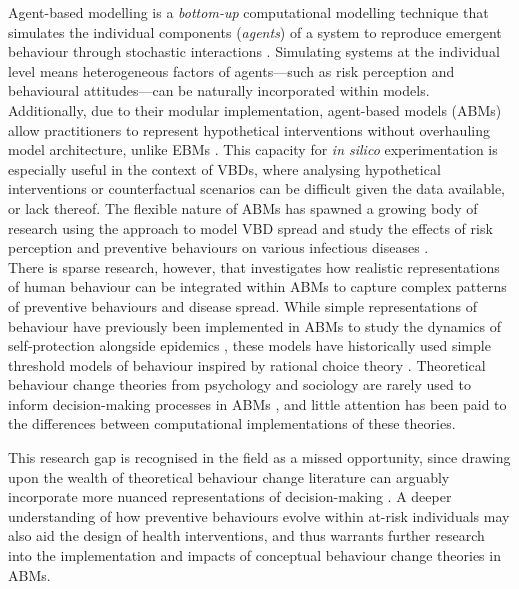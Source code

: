 Agent-based modelling is a \textit{bottom-up} computational modelling technique that simulates the individual components (\textit{agents}) of a system to reproduce emergent behaviour through stochastic interactions \cite{epstein_growing_1996}. Simulating systems at the individual level means heterogeneous factors of agents---such as risk perception and behavioural attitudes---can be naturally incorporated within models. Additionally, due to their modular implementation, agent-based models (ABMs) allow practitioners to represent hypothetical interventions without overhauling model architecture, unlike EBMs \cite{axtell_agent-based_2022}. This capacity for \textit{in silico} experimentation is especially useful in the context of VBDs, where analysing hypothetical interventions or counterfactual scenarios can be difficult given the data available, or lack thereof. The flexible nature of ABMs has spawned a growing body of research using the approach to model VBD spread \cite{krzhizhanovskaya_agent-based_2020, selvaraj_vector_2020, manore_network-patch_2015, linard_multi-agent_2009, jacintho_agent-based_2010, perkins_agent-based_2019, mulyani_agent_2017, maneerat_spatial_2016} and study the effects of risk perception and preventive behaviours on various infectious diseases \cite{mao_modeling_2014, kandiah_empirical_2017, du_how_2021, tully_coevolution_2013, andrews_disease_2015}. \\

There is sparse research, however, that investigates how realistic representations of human behaviour can be integrated within ABMs to capture complex patterns of preventive behaviours and disease spread. While simple representations of behaviour have previously been implemented in ABMs to study the dynamics of self-protection alongside epidemics \cite{mao_modeling_2014, barbrook-johnson_uses_2017, du_how_2021, scheidegger_agent-based_2017, mateus_c_modeling_2021}, these models have historically used simple threshold models of behaviour inspired by rational choice theory \cite{bedson_review_2021, janssen_empirically_2006, verelst_behavioural_2016}. Theoretical behaviour change theories from psychology and sociology are rarely used to inform decision-making processes in ABMs \cite{weston_infection_2018}, and little attention has been paid to the differences between computational implementations of these theories.

This research gap is recognised in the field as a missed opportunity, since drawing upon the wealth of theoretical behaviour change literature can arguably incorporate more nuanced representations of decision-making \cite{weston_infection_2018, funk_modelling_2010}. A deeper understanding of how preventive behaviours evolve within at-risk individuals may also aid the design of health interventions, and thus warrants further research into the implementation and impacts of conceptual behaviour change theories in ABMs.

